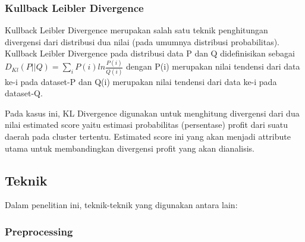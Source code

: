 \documentclass{article}
\begin{document}
\subsubsection{Kullback Leibler Divergence}
\begin{adjustwidth}{4em}{0pt}
\hspace{\parindent}Kullback Leibler Divergence merupakan salah satu teknik penghitungan divergensi dari distribusi dua nilai (pada umumnya distribusi probabilitas). Kullback Leibler Divergence pada distribusi data  P dan Q  didefinisikan sebagai 
$D_{Kl}(P||Q) = \sum\limits_{i}P(i)ln\frac{P(i)}{Q(i)}$
dengan P(i) merupakan nilai tendensi dari data ke-i pada dataset-P dan Q(i) merupakan nilai tendensi dari data ke-i pada dataset-Q.

Pada kasus ini, KL Divergence digunakan untuk menghitung divergensi dari dua nilai estimated score yaitu estimasi probabilitas (persentase) profit dari suatu daerah pada cluster tertentu. Estimated score ini  yang akan menjadi attribute utama untuk membandingkan divergensi profit yang akan dianalisis.

\end{adjustwidth}

\subsection{Teknik}

\begin{adjustwidth}{2em}{0pt}

\hspace{\parindent}Dalam penelitian ini, teknik-teknik yang digunakan antara lain:

\end{adjustwidth}

\subsubsection{Preprocessing}
\end{document}
